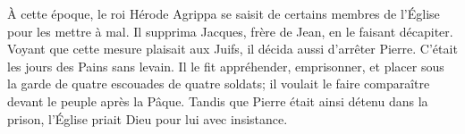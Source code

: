 À cette époque, le roi Hérode Agrippa
		se saisit de certains membres de l’Église pour les mettre à mal.
	Il supprima Jacques, frère de Jean, en le faisant décapiter.
Voyant que cette mesure plaisait aux Juifs, il décida aussi d’arrêter Pierre.
	C’était les jours des Pains sans levain.
Il le fit appréhender, emprisonner,
	et placer sous la garde de quatre escouades de quatre soldats;
	il voulait le faire comparaître devant le peuple après la Pâque.
Tandis que Pierre était ainsi détenu dans la prison,
	l’Église priait Dieu pour lui avec insistance.
